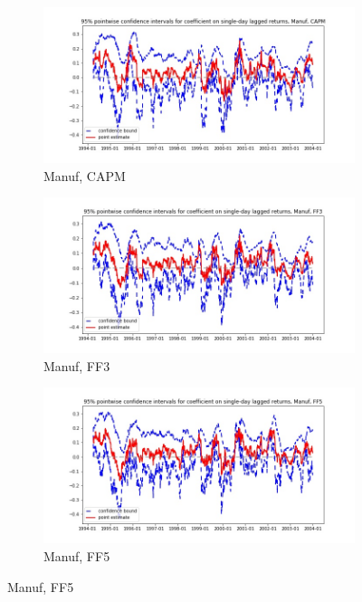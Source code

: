 \documentclass{article}
\begin{document}
\begin{landscape}
  \newpage
  
  \begin{figure}
  \centering
  \begin{subfigure}[b]{0.4\paperwidth}
    \centering
    \includegraphics[width=\textwidth]{Manuf/bwunif_pointwiseCIs_CAPM.jpg}
    \caption{Manuf, CAPM}
    \label{fig:1}
  \end{subfigure}
  \begin{subfigure}[b]{0.4\paperwidth}
    \centering
    \includegraphics[width=\textwidth]{Manuf/bwunif_pointwiseCIs_FF3.jpg}
    \caption{Manuf, FF3}
    \label{fig:2}
  \end{subfigure}
    \begin{subfigure}[b]{0.4\paperwidth}
    \centering
    \includegraphics[width=\textwidth]{Manuf/bwunif_pointwiseCIs_FF5.jpg}
    \caption{Manuf, FF5}
    \label{fig:1}
  \end{subfigure}
  \end{figure}
  

\end{landscape}
\end{document}
